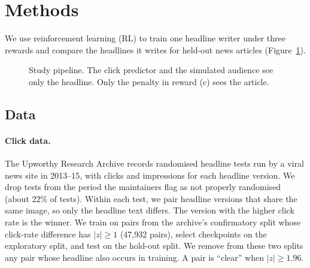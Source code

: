 \section{Methods}
We use reinforcement learning (RL) to train one headline writer under three rewards and compare the headlines it writes for held-out news articles (Figure~\ref{fig:pipeline}).

\begin{figure}[t]
\centering
{}
\caption{Study pipeline. The click predictor and the simulated audience see only the headline. Only the penalty in reward (c) sees the article.}
\label{fig:pipeline}
\end{figure}

\subsection{Data}
\paragraph{Click data.} The Upworthy Research Archive \citep{matias2021upworthy} records randomised headline tests run by a viral news site in 2013--15, with clicks and impressions for each headline version. We drop tests from the period the maintainers flag as not properly randomised (about 22\% of tests). Within each test, we pair headline versions that share the same image, so only the headline text differs. The version with the higher click rate is the winner. We train on pairs from the archive's confirmatory split whose click-rate difference has $|z|\ge 1$ (47,932 pairs), select checkpoints on the exploratory split, and test on the hold-out split. We remove from these two splits any pair whose headline also occurs in training. A pair is ``clear'' when $|z|\ge 1.96$.

